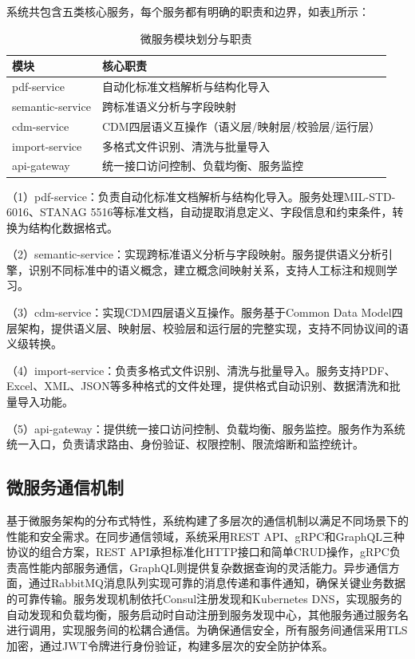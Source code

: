 系统共包含五类核心服务，每个服务都有明确的职责和边界，如表\ref{table:microservices}所示：

\begin{table}[H]
    \caption{微服务模块划分与职责}
    \label{table:microservices}
    \centering
    \begin{tabular}{|l|l|}
        \hline
        \textbf{模块} & \textbf{核心职责} \\
        \hline
        pdf-service & 自动化标准文档解析与结构化导入 \\
        semantic-service & 跨标准语义分析与字段映射 \\
        cdm-service & CDM四层语义互操作（语义层/映射层/校验层/运行层） \\
        import-service & 多格式文件识别、清洗与批量导入 \\
        api-gateway & 统一接口访问控制、负载均衡、服务监控 \\
        \hline
    \end{tabular}
\end{table}

（1）pdf-service：负责自动化标准文档解析与结构化导入。服务处理MIL-STD-6016、STANAG 5516等标准文档，自动提取消息定义、字段信息和约束条件，转换为结构化数据格式。

（2）semantic-service：实现跨标准语义分析与字段映射。服务提供语义分析引擎，识别不同标准中的语义概念，建立概念间映射关系，支持人工标注和规则学习。

（3）cdm-service：实现CDM四层语义互操作。服务基于Common Data Model四层架构，提供语义层、映射层、校验层和运行层的完整实现，支持不同协议间的语义级转换。

（4）import-service：负责多格式文件识别、清洗与批量导入。服务支持PDF、Excel、XML、JSON等多种格式的文件处理，提供格式自动识别、数据清洗和批量导入功能。

（5）api-gateway：提供统一接口访问控制、负载均衡、服务监控。服务作为系统统一入口，负责请求路由、身份验证、权限控制、限流熔断和监控统计。

\subsection{微服务通信机制}

基于微服务架构的分布式特性，系统构建了多层次的通信机制以满足不同场景下的性能和安全需求。在同步通信领域，系统采用REST API、gRPC和GraphQL三种协议的组合方案，REST API承担标准化HTTP接口和简单CRUD操作，gRPC负责高性能内部服务通信，GraphQL则提供复杂数据查询的灵活能力。异步通信方面，通过RabbitMQ消息队列实现可靠的消息传递和事件通知，确保关键业务数据的可靠传输。服务发现机制依托Consul注册发现和Kubernetes DNS，实现服务的自动发现和负载均衡，服务启动时自动注册到服务发现中心，其他服务通过服务名进行调用，实现服务间的松耦合通信。为确保通信安全，所有服务间通信采用TLS加密，通过JWT令牌进行身份验证，构建多层次的安全防护体系。

